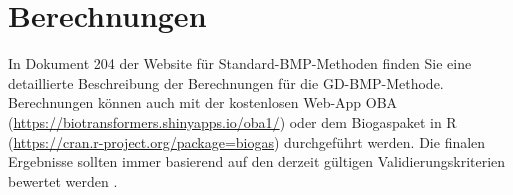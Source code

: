 \documentclass[]{article}
\begin{document}
\section{Berechnungen}
In Dokument 204 der Website für Standard-BMP-Methoden \citep{BMPdoc204gasdens} finden Sie eine detaillierte Beschreibung der Berechnungen für die GD-BMP-Methode.
Berechnungen können auch mit der kostenlosen Web-App OBA (\url{https://biotransformers.shinyapps.io/oba1/}) oder dem Biogaspaket in R (\url{https://cran.r-project.org/package=biogas}) \citep{hafnerSoftwareBiogasResearch2018} durchgeführt werden.
Die finalen Ergebnisse sollten immer basierend auf den derzeit gültigen Validierungskriterien bewertet werden \citep{BMPdoc100req}.


\end{document}

